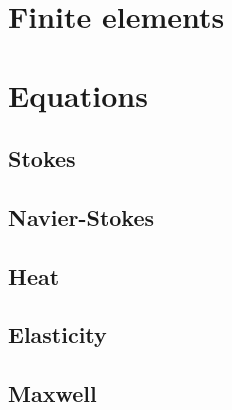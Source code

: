 \documentclass{article}
\begin{document}
\section{Finite elements}

\section{Equations}
\subsection{Stokes}
\subsection{Navier-Stokes}
\subsection{Heat}
\subsection{Elasticity}
\subsection{Maxwell}
\end{document}
